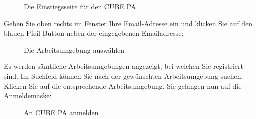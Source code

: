\begin{figure}[H]
\caption{Die Einstiegsseite für den CUBE PA}
\end{figure}

Geben Sie oben rechts im Fenster Ihre Email-Adresse ein und klicken Sie auf den blauen Pfeil-Button neben der eingegebenen Emailadresse:

\begin{figure}[H]
\caption{Die Arbeitsumgebung auswählen}
\end{figure}

Es werden sämtliche Arbeitsumgebungen angezeigt, bei welchen Sie registriert sind. Im Suchfeld können Sie nach der gewünschten Arbeitsumgebung suchen. Klicken Sie auf die entsprechende Arbeitsumgebung. Sie gelangen nun auf die Anmeldemaske:

\begin{figure}[H]
\caption{An CUBE PA anmelden}
\end{figure}


